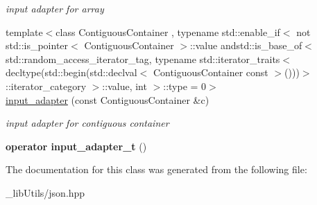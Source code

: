 \begin{DoxyCompactItemize}
\begin{DoxyCompactList}\small\item\em input adapter for array \end{DoxyCompactList}\item 
{\footnotesize template$<$class Contiguous\+Container , typename std\+::enable\+\_\+if$<$ not std\+::is\+\_\+pointer$<$ Contiguous\+Container $>$\+::value andstd\+::is\+\_\+base\+\_\+of$<$ std\+::random\+\_\+access\+\_\+iterator\+\_\+tag, typename std\+::iterator\+\_\+traits$<$ decltype(std\+::begin(std\+::declval$<$ Contiguous\+Container const  $>$()))$>$\+::iterator\+\_\+category $>$\+::value, int $>$\+::type  = 0$>$ }\\\hyperlink{classnlohmann_1_1detail_1_1input__adapter_a6f92fe82cb49a508dbfb297c5630cc7f}{input\+\_\+adapter} (const Contiguous\+Container \&c)\hypertarget{classnlohmann_1_1detail_1_1input__adapter_a6f92fe82cb49a508dbfb297c5630cc7f}{}\label{classnlohmann_1_1detail_1_1input__adapter_a6f92fe82cb49a508dbfb297c5630cc7f}

\begin{DoxyCompactList}\small\item\em input adapter for contiguous container \end{DoxyCompactList}\item 
{\bfseries operator input\+\_\+adapter\+\_\+t} ()\hypertarget{classnlohmann_1_1detail_1_1input__adapter_a4ef04b9490247fc38f3d1c2a9e18789b}{}\label{classnlohmann_1_1detail_1_1input__adapter_a4ef04b9490247fc38f3d1c2a9e18789b}

\end{DoxyCompactItemize}


The documentation for this class was generated from the following file\+:\begin{DoxyCompactItemize}
\item 
\+\_\+lib\+Utils/json.\+hpp\end{DoxyCompactItemize}
